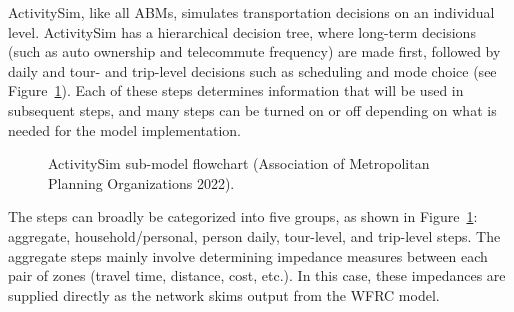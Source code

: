 \documentclass[fancy, oneside, mastersfancy, ms]{byuthesis}
\begin{document}
ActivitySim, like all ABMs, simulates transportation decisions on an
individual level. ActivitySim has a hierarchical decision tree, where
long-term decisions (such as auto ownership and telecommute frequency)
are made first, followed by daily and tour- and trip-level decisions
such as scheduling and mode choice (see
Figure~\ref{fig-asim-flowchart}). Each of these steps determines
information that will be used in subsequent steps, and many steps can be
turned on or off depending on what is needed for the model
implementation.

\begin{figure}


\caption[ActivitySim sub-model
flowchart.]{\label{fig-asim-flowchart}ActivitySim sub-model flowchart
(Association of Metropolitan Planning Organizations 2022).}

\end{figure}%

The steps can broadly be categorized into five groups, as shown in
Figure~\ref{fig-asim-flowchart}: aggregate, household/personal, person
daily, tour-level, and trip-level steps. The aggregate steps mainly
involve determining impedance measures between each pair of zones
(travel time, distance, cost, etc.). In this case, these impedances are
supplied directly as the network skims output from the WFRC model.
\end{document}
